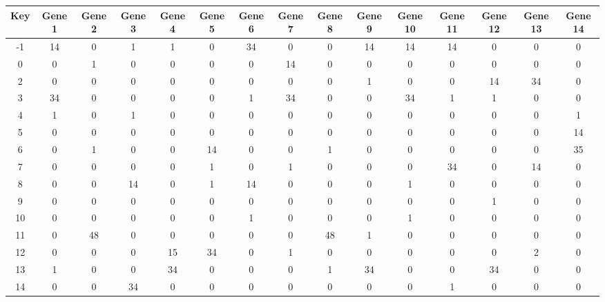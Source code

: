 \begin{tabular}{|c|c|c|c|c|c|c|c|c|c|c|c|c|c|c|}
\hline
Key & Gene 1 & Gene 2 & Gene 3 & Gene 4 & Gene 5 & Gene 6 & Gene 7 & Gene 8 & Gene 9 & Gene 10 & Gene 11 & Gene 12 & Gene 13 & Gene 14 \\
\hline
-1 & 14 & 0 & 1 & 1 & 0 & 34 & 0 & 0 & 14 & 14 & 14 & 0 & 0 & 0 \\
0 & 0 & 1 & 0 & 0 & 0 & 0 & 14 & 0 & 0 & 0 & 0 & 0 & 0 & 0 \\
2 & 0 & 0 & 0 & 0 & 0 & 0 & 0 & 0 & 1 & 0 & 0 & 14 & 34 & 0 \\
3 & 34 & 0 & 0 & 0 & 0 & 1 & 34 & 0 & 0 & 34 & 1 & 1 & 0 & 0 \\
4 & 1 & 0 & 1 & 0 & 0 & 0 & 0 & 0 & 0 & 0 & 0 & 0 & 0 & 1 \\
5 & 0 & 0 & 0 & 0 & 0 & 0 & 0 & 0 & 0 & 0 & 0 & 0 & 0 & 14 \\
6 & 0 & 1 & 0 & 0 & 14 & 0 & 0 & 1 & 0 & 0 & 0 & 0 & 0 & 35 \\
7 & 0 & 0 & 0 & 0 & 1 & 0 & 1 & 0 & 0 & 0 & 34 & 0 & 14 & 0 \\
8 & 0 & 0 & 14 & 0 & 1 & 14 & 0 & 0 & 0 & 1 & 0 & 0 & 0 & 0 \\
9 & 0 & 0 & 0 & 0 & 0 & 0 & 0 & 0 & 0 & 0 & 0 & 1 & 0 & 0 \\
10 & 0 & 0 & 0 & 0 & 0 & 1 & 0 & 0 & 0 & 1 & 0 & 0 & 0 & 0 \\
11 & 0 & 48 & 0 & 0 & 0 & 0 & 0 & 48 & 1 & 0 & 0 & 0 & 0 & 0 \\
12 & 0 & 0 & 0 & 15 & 34 & 0 & 1 & 0 & 0 & 0 & 0 & 0 & 2 & 0 \\
13 & 1 & 0 & 0 & 34 & 0 & 0 & 0 & 1 & 34 & 0 & 0 & 34 & 0 & 0 \\
14 & 0 & 0 & 34 & 0 & 0 & 0 & 0 & 0 & 0 & 0 & 1 & 0 & 0 & 0 \\
\hline
\end{tabular}